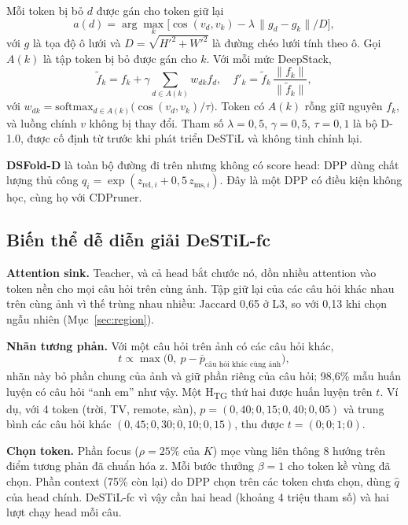 \documentclass[conference]{IEEEtran}
\newcommand{\qhat}{\ensuremath{\hat{q}}}
\newcommand{\Htg}{H\textsubscript{TG}}
\begin{document}
Mỗi token bị bỏ $d$ được gán cho token giữ lại
\begin{equation}
a(d)=\arg\max_k\big[\cos(v_d,v_k)-\lambda\,\|g_d-g_k\|/D\big],
\end{equation}
với $g$ là tọa độ ô lưới và $D=\sqrt{H'^2+W'^2}$ là đường chéo lưới tính theo ô. Gọi $A(k)$ là tập token bị bỏ được gán cho $k$. Với mỗi mức DeepStack,
\begin{equation}
\tilde f_k=f_k+\gamma\!\!\sum_{d\in A(k)}\!\! w_{dk}f_d,\quad f'_k=\tilde f_k\,\frac{\|f_k\|}{\|\tilde f_k\|},
\end{equation}
với $w_{dk}=\mathrm{softmax}_{d\in A(k)}\big(\cos(v_d,v_k)/\tau\big)$. Token có $A(k)$ rỗng giữ nguyên $f_k$, và luồng chính $v$ không bị thay đổi. Tham số $\lambda=0{,}5$, $\gamma=0{,}5$, $\tau=0{,}1$ là bộ D-1.0, được cố định từ trước khi phát triển DeSTiL và không tinh chỉnh lại.

\textbf{DSFold-D} là toàn bộ đường đi trên nhưng không có score head: DPP dùng chất lượng thủ công $q_i=\exp(z_{\text{rel},i}+0{,}5\,z_{\text{ms},i})$. Đây là một DPP có điều kiện không học, cùng họ với CDPruner.

\subsection{Biến thể dễ diễn giải DeSTiL-fc}
\label{sec:fc}
\textbf{Attention sink.} Teacher, và cả head bắt chước nó, dồn nhiều attention vào token nền cho mọi câu hỏi trên cùng ảnh. Tập giữ lại của các câu hỏi khác nhau trên cùng ảnh vì thế trùng nhau nhiều: Jaccard 0,65 ở L3, so với 0,13 khi chọn ngẫu nhiên (Mục~\ref{sec:region}).

\textbf{Nhãn tương phản.} Với một câu hỏi trên ảnh có các câu hỏi khác,
\begin{equation}
t\propto\max\big(0,\ p-\overline{p}_{\text{câu hỏi khác cùng ảnh}}\big),
\end{equation}
nhãn này bỏ phần chung của ảnh và giữ phần riêng của câu hỏi; 98,6\% mẫu huấn luyện có câu hỏi ``anh em'' như vậy. Một \Htg{} thứ hai được huấn luyện trên $t$. Ví dụ, với 4 token (trời, TV, remote, sàn), $p=(0{,}40;0{,}15;0{,}40;0{,}05)$ và trung bình các câu hỏi khác $(0{,}45;0{,}30;0{,}10;0{,}15)$, thu được $t=(0;0;1;0)$.

\textbf{Chọn token.} Phần focus ($\rho=25\%$ của $K$) mọc vùng liên thông 8 hướng trên điểm tương phản đã chuẩn hóa z. Mỗi bước thưởng $\beta=1$ cho token kề vùng đã chọn. Phần context (75\% còn lại) do DPP chọn trên các token chưa chọn, dùng $\qhat$ của head chính. DeSTiL-fc vì vậy cần hai head (khoảng 4 triệu tham số) và hai lượt chạy head mỗi câu.
\end{document}
